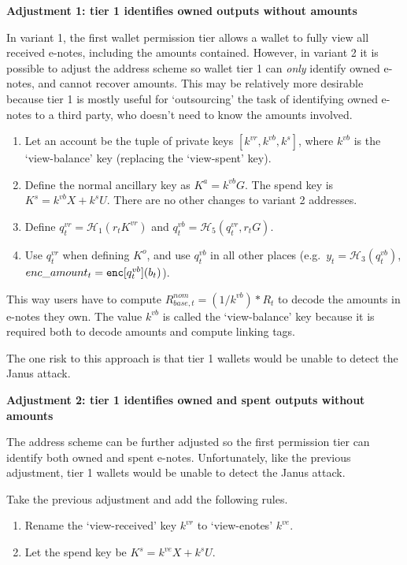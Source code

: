 \textbf{Adjustment 1: tier 1 identifies owned outputs without amounts}

In variant 1, the first wallet permission tier allows a wallet to fully view all received e-notes, including the amounts contained. However, in variant 2 it is possible to adjust the address scheme so wallet tier 1 can {\em only} identify owned e-notes, and cannot recover amounts. This may be relatively more desirable because tier 1 is mostly useful for `outsourcing' the task of identifying owned e-notes to a third party, who doesn't need to know the amounts involved.

\begin{enumerate}
    \item Let an account be the tuple of private keys $[k^{vr}, k^{vb}, k^s]$, where $k^{vb}$ is the `view-balance' key (replacing the `view-spent' key).

    \item Define the normal ancillary key as $K^a = k^{vb} G$. The spend key is $K^s = k^{vb} X + k^s U$. There are no other changes to variant 2 addresses.

    \item Define $q^{vr}_t = \mathcal{H}_1(r_t K^{vr})$ and $q^{vb}_t = \mathcal{H}_5(q^{vr}_t, r_t G)$.

    \item Use $q^{vr}_t$ when defining $K^o$, and use $q^{vb}_t$ in all other places (e.g.\ $y_t = \mathcal{H}_3(q^{vb}_t)$, $enc\_amount_t = \textrm{\tt enc}[q^{vb}_t](b_t)$).
\end{enumerate}

This way users have to compute $R^{nom}_{base,t} = (1/k^{vb})*R_t$ to decode the amounts in e-notes they own. The value $k^{vb}$ is called the `view-balance' key because it is required both to decode amounts and compute linking tags.

The one risk to this approach is that tier 1 wallets would be unable to detect the Janus attack.

\textbf{Adjustment 2: tier 1 identifies owned and spent outputs without amounts}

The address scheme can be further adjusted so the first permission tier can identify both owned and spent e-notes. Unfortunately, like the previous adjustment, tier 1 wallets would be unable to detect the Janus attack.

Take the previous adjustment and add the following rules.

\begin{enumerate}
    \item Rename the `view-received' key $k^{vr}$ to `view-enotes' $k^{ve}$.

    \item Let the spend key be $K^s = k^{ve} X + k^s U$.
\end{enumerate}


